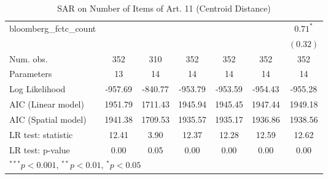 \begin{table}[!h]
\begin{center}
\begin{tabular}{l c c c c c c }
bloomberg\_fctc\_count  &              &              &              &              &              & $0.71^{*}$   \\
                        &              &              &              &              &              & $(0.32)$     \\
\midrule
Num. obs.               & 352          & 310          & 352          & 352          & 352          & 352          \\
Parameters              & 13           & 14           & 14           & 14           & 14           & 14           \\
Log Likelihood          & -957.69      & -840.77      & -953.79      & -953.59      & -954.43      & -955.28      \\
AIC (Linear model)      & 1951.79      & 1711.43      & 1945.94      & 1945.45      & 1947.44      & 1949.18      \\
AIC (Spatial model)     & 1941.38      & 1709.53      & 1935.57      & 1935.17      & 1936.86      & 1938.56      \\
LR test: statistic      & 12.41        & 3.90         & 12.37        & 12.28        & 12.59        & 12.62        \\
LR test: p-value        & 0.00         & 0.05         & 0.00         & 0.00         & 0.00         & 0.00         \\
\bottomrule
\multicolumn{7}{l}{\scriptsize{$^{***}p<0.001$, $^{**}p<0.01$, $^*p<0.05$}}
\end{tabular}
\caption{SAR on Number of Items of Art. 11 (Centroid Distance)}
\label{table:coefficients}
\end{center}
\end{table}
